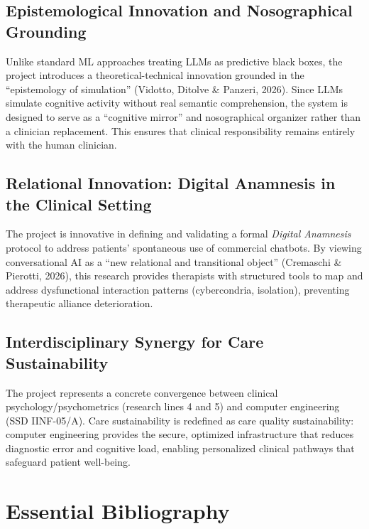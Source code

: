 \documentclass[11pt,a4paper]{article}
\begin{document}
\subsection{Epistemological Innovation and Nosographical Grounding}
Unlike standard ML approaches treating LLMs as predictive black boxes, the project introduces a theoretical-technical innovation grounded in the ``epistemology of simulation'' (Vidotto, Ditolve \& Panzeri, 2026). Since LLMs simulate cognitive activity without real semantic comprehension, the system is designed to serve as a ``cognitive mirror'' and nosographical organizer rather than a clinician replacement. This ensures that clinical responsibility remains entirely with the human clinician.

\subsection{Relational Innovation: Digital Anamnesis in the Clinical Setting}
The project is innovative in defining and validating a formal \textit{Digital Anamnesis} protocol to address patients' spontaneous use of commercial chatbots. By viewing conversational AI as a ``new relational and transitional object'' (Cremaschi \& Pierotti, 2026), this research provides therapists with structured tools to map and address dysfunctional interaction patterns (cybercondria, isolation), preventing therapeutic alliance deterioration.

\subsection{Interdisciplinary Synergy for Care Sustainability}
The project represents a concrete convergence between clinical psychology/psychometrics (research lines 4 and 5) and computer engineering (SSD IINF-05/A). Care sustainability is redefined as care quality sustainability: computer engineering provides the secure, optimized infrastructure that reduces diagnostic error and cognitive load, enabling personalized clinical pathways that safeguard patient well-being.

\section{Essential Bibliography}
\end{document}
